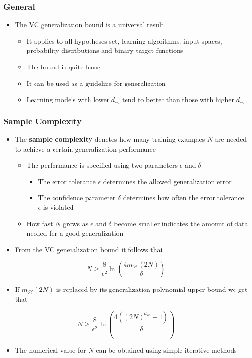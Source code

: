 \documentclass[11pt]{article}
\begin{document}
\subsubsection{General}
\label{sec:org9863299}
\begin{itemize}
\item The VC generalization bound is a universal result
\begin{itemize}
\item It applies to all hypotheses set, learning algorithms, input spaces, probability distributions and binary target functions
\item The bound is quite loose
\item It can be used as a guideline for generalization
\item Learning models with lower \(d_\text{vc}\) tend to better than those with higher \(d_\text{vc}\)
\end{itemize}
\end{itemize}

\subsubsection{Sample Complexity}
\label{sec:org1cf1b07}
\begin{itemize}
\item The \textbf{sample complexity} denotes how many training examples \(N\) are needed to achieve a certain generalization performance
\begin{itemize}
\item The performance is specified using two parameters \(\epsilon\) and \(\delta\) 
\begin{itemize}
\item The error tolerance \(\epsilon\) determines the allowed generalization error
\item The confidence parameter \(\delta\) determines how often the error tolerance \(\epsilon\) is violated
\end{itemize}
\item How fast \(N\) grows as \(\epsilon\) and \(\delta\) become smaller indicates the amount of data needed for a good generalization
\end{itemize}

\item From the VC generalization bound it follows that
\end{itemize}
\begin{equation}
    N \geq \frac8{\epsilon^2} \ln (\frac{4m_\mathcal H (2N)}\delta)
\end{equation}
\begin{itemize}
\item If \(m_\mathcal H(2N)\) is replaced by its generalization polynomial upper bound we get that
\end{itemize}
\begin{equation}
    N \geq \frac8{\epsilon^2} \ln (\frac{4((2N)^{d_\text{vc}} +1)} \delta)
\end{equation}
\begin{itemize}
\item The numerical value for \(N\) can be obtained using simple iterative methods
\end{itemize}
\end{document}
